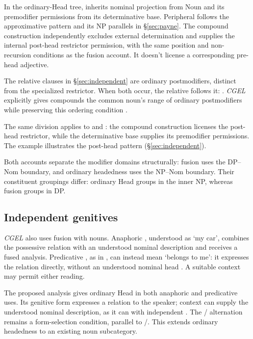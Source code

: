 \documentclass[12pt]{article}
\begin{document}
In the ordinary-Head tree,  inherits nominal projection from Noun and its premodifier permissions from its determinative base. Peripheral  follows the approximative pattern and its NP parallels in §\ref{sec:payne}. The compound construction independently excludes external determination and supplies the internal post-head restrictor permission, with the same position and non-recursion conditions as the fusion account. It doesn't license a corresponding pre-head adjective.

The relative clauses in §\ref{sec:independent} are ordinary postmodifiers, distinct from the specialized restrictor. When both occur, the relative follows it: . \textit{CGEL} explicitly gives compounds the common noun's range of ordinary postmodifiers while preserving this ordering condition \citep[423]{huddleston2002}.

The same division applies to  and : the compound construction licenses the post-head restrictor, while the determinative base supplies its premodifier permissions. The example  illustrates the post-head pattern (§\ref{sec:independent}).

Both accounts separate the modifier domains structurally: fusion uses the DP--Nom boundary, and ordinary headedness uses the NP--Nom boundary. Their constituent groupings differ: ordinary Head groups  in the inner NP, whereas fusion groups  in DP.

\subsection{Independent genitives}\label{sec:genitive-head}

\textit{CGEL} also uses fusion with nouns. Anaphoric , understood as \enquote*{my car}, combines the possessive relation with an understood nominal description and receives a fused analysis. Predicative , as in , can instead mean \enquote*{belongs to me}: it expresses the relation directly, without an understood nominal head \citep[410--411, 470--471]{huddleston2002}. A suitable context may permit either reading.

The proposed analysis gives  ordinary Head in both anaphoric and predicative uses. Its genitive form expresses a relation to the speaker; context can supply the understood nominal description, as it can with independent . The / alternation remains a form-selection condition, parallel to /. This extends ordinary headedness to an existing noun subcategory.
\end{document}
